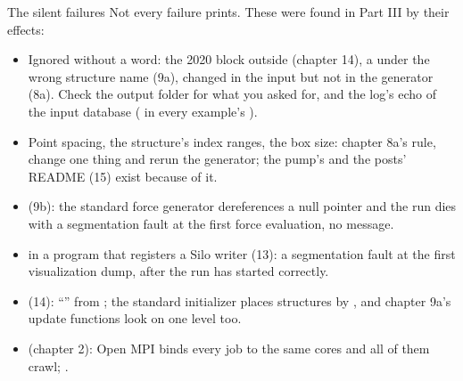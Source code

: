 \documentclass[aspectratio=169,11pt]{beamer}
\begin{document}
\begin{frame}{The silent failures}
\label{fr:silent}
\footnotesize Not every failure prints. These were found in Part III by their effects:
\begin{itemize}\footnotesize
  \item {} Ignored without a word: the 2020  block outside  (chapter 14), a  under the wrong structure name (9a),  changed in the input but not in the generator (8a). Check the output folder for what you asked for, and the log's echo of the input database ( in every example's ).
  \item {} Point spacing, the structure's index ranges, the box size: chapter 8a's rule, change one thing and rerun the generator; the pump's  and the posts' README (15) exist because of it.
  \item {} (9b): the standard force generator dereferences a null pointer and the run dies with a segmentation fault at the first force evaluation, no message.
  \item {} in a program that registers a Silo writer (13): a segmentation fault at the first visualization dump, after the run has started correctly.
  \item {} (14): ``'' from ; the standard initializer places structures by , and chapter 9a's update functions look on one level too.
  \item {} (chapter 2): Open MPI binds every job to the same cores and all of them crawl; .
\end{itemize}
\end{frame}
\end{document}

